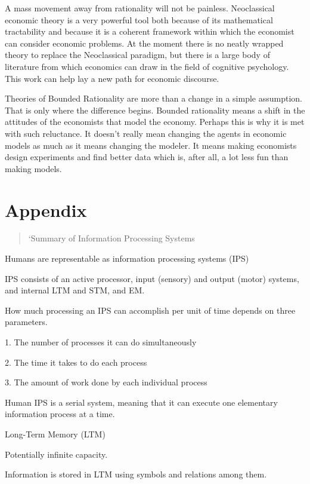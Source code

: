 \documentclass{ucthesis}
\begin{document}
A mass movement away from rationality will not be painless. Neoclassical
economic theory is a very powerful tool both because of its mathematical
tractability and because it is a coherent framework within which the
economist can consider economic problems. At the moment there is no neatly
wrapped theory to replace the Neoclassical paradigm, but there is a large
body of literature from which economics can draw in the field of cognitive
psychology. This work can help lay a new path for economic discourse.

Theories of Bounded Rationality are more than a change in a simple
assumption. That is only where the difference begins. Bounded rationality
means a shift in the attitudes of the economists that model the economy.
Perhaps this is why it is met with such reluctance. It doesn't really mean
changing the agents in economic models as much as it means changing the
modeler. It means making economists design experiments and find better data
which is, after all, a lot less fun than making models.

\bigskip

\section{Appendix}

\begin{quotation}
`Summary of Information Processing Systems
\end{quotation}

Humans are representable as information processing systems (IPS)

IPS consists of an active processor, input (sensory) and output (motor)
systems, and internal LTM and STM, and EM.

How much processing an IPS can accomplish per unit of time depends on three
parameters.

1. The number of processes it can do simultaneously

2. The time it takes to do each process

3. The amount of work done by each individual process

Human IPS is a serial system, meaning that it can execute one elementary
information process at a time.

Long-Term Memory (LTM)

\textbullet \qquad Potentially infinite capacity.

\textbullet \qquad Information is stored in LTM using symbols and relations
among them.
\end{document}
